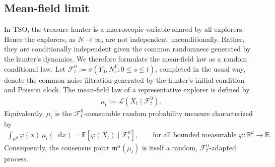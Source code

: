 \documentclass{article}
\newcommand*\der{\mathop{}\!\mathrm{d}}
\numberwithin{equation}{section}
\begin{document}
 \subsection{Mean-field limit} \label{tso_sec_mean_field}
In TSO, the treasure hunter is a macroscopic variable shared by all explorers. Hence the  explorers, as $N \rightarrow \infty$, are not independent unconditionally. Rather, they are conditionally independent given the common randomness generated by the hunter's dynamics. We therefore formulate the mean-field law as a random conditional law.
Let $ \mathcal F_t^0:=\sigma(Y_0,N_s^Y:0\le s\leq t)$,
completed in the usual way, denote the common-noise filtration generated by the hunter's initial condition and Poisson clock. The mean-field law of a representative explorer is defined by
\begin{align}
    \mu_t:=\mathcal L(X_t\mid \mathcal F_t^0).
\end{align}
Equivalently, $\mu_t$ is the $\mathcal F_t^0$-measurable random probability measure characterized by
\begin{align}
    \int_{\mathbb R^d}\varphi(x)\,\mu_t(\der x)
    =
    \mathbb E[\varphi(X_t)\mid\mathcal F_t^0],
    \qquad
    \text{for all bounded measurable }\varphi:\mathbb R^d\to\mathbb R.
\end{align}
Consequently, the consensus point $\mathfrak m^\alpha(\mu_t)$ is itself a random, $\mathcal F^0_t$-adapted process.
\end{document}
